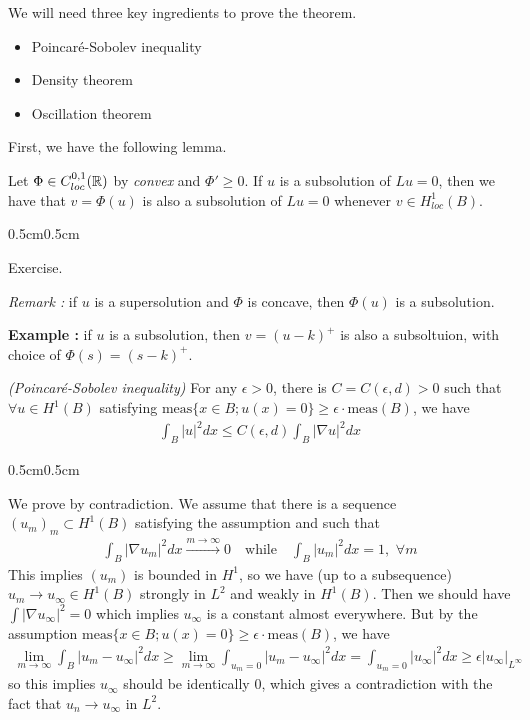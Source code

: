\documentclass[12pt,a4paper]{article}
\newenvironment{proof}
{\begin{changemargin}{0.5cm}{0.5cm} 
	}%
	{\end{changemargin}
}
\newenvironment{p}
{\begin{proof} 
	}%
	{\end{proof}
}
\begin{document}
We will need three key ingredients to prove the theorem.
\begin{itemize}
\item Poincar\'{e}-Sobolev inequality
\item Density theorem
\item Oscillation theorem
\end{itemize}
\s

First, we have the following lemma.
\s

\lem Let $\Phi \in C^{0,1}_{loc}(\mathbb{R})$ by \emph{convex} and $\Phi' \geq 0$. If $u$ is a subsolution of $Lu =0$, then we have that $v= \Phi(u)$ is also a subsolution of $Lu =0$ whenever $v\in H_{loc}^1(B)$.
\begin{p}
\pf Exercise.
\end{p}
\s

\emph{Remark :} if $u$ is a supersolution and $\Phi$ is concave, then $\Phi(u)$ is a subsolution.
\s

\textbf{Example :} if $u$ is a subsolution, then $v = (u-k)^+$ is also a subsoltuion, with choice of $\Phi(s) = (s-k)^+$.
\s

\prop \emph{(Poincar\'e-Sobolev inequality)} For any $\epsilon >0$, there is $C = C(\epsilon, d)>0$ such that $\forall u\in H^1(B)$ satisfying $\text{meas}\{x\in B ; u(x) =0 \}\geq \epsilon \cdot \text{meas}(B)$, we have
\begin{align*}
\int_B |u|^2 dx \leq C(\epsilon, d) \int_B |\nabla u|^2 dx 
\end{align*}
\begin{p}
\pf We prove by contradiction. We assume that there is a sequence $(u_m)_m \subset H^1(B)$ satisfying the assumption and such that
\begin{align*}
\int_B |\nabla u_m|^2 dx \xrightarrow{m\rightarrow \infty} 0 \quad \text{while} \quad \int_B |u_m|^2 dx = 1, \,\,\forall m
\end{align*} 
This implies $(u_m)$ is bounded in $H^1$, so we have (up to a subsequence) $u_m \rightarrow u_{\infty} \in H^1(B)$ strongly in $L^2$ and weakly in $H^1(B)$. Then we should have $\int |\nabla u_{\infty}|^2 =0$ which implies $u_{\infty}$ is a constant almost everywhere. But by the assumption $\text{meas}\{x\in B ; u(x) =0 \}\geq \epsilon \cdot \text{meas}(B)$, we have
\begin{align*}
\lim_{m\rightarrow \infty} \int_{B} |u_m - u_{\infty}|^2 dx \geq \lim_{m\rightarrow \infty} \int_{u_m =0} |u_m - u_{\infty}|^2 dx  = \int_{u_m =0} |u_{\infty}|^2 dx  \geq \epsilon |u_{\infty}|_{L^{\infty}}
\end{align*}
so this implies $u_{\infty}$ should be identically 0, which gives a contradiction with the fact that $u_n \rightarrow u_{\infty}$ in $L^2$.

\eop
\end{p}
\s
\end{document}
